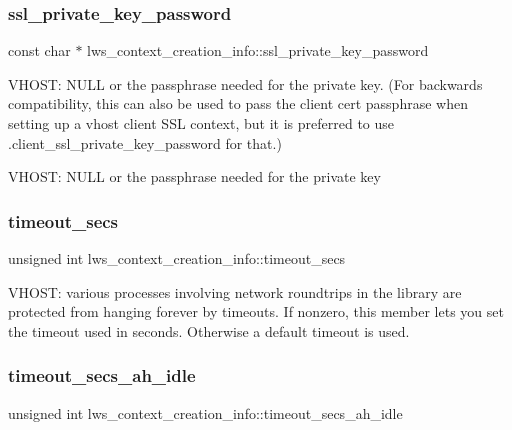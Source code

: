 \subsubsection{\texorpdfstring{ssl\+\_\+private\+\_\+key\+\_\+password}{ssl\_private\_key\_password}}
{\footnotesize\ttfamily const char $\ast$ lws\+\_\+context\+\_\+creation\+\_\+info\+::ssl\+\_\+private\+\_\+key\+\_\+password}

V\+H\+O\+ST\+: N\+U\+LL or the passphrase needed for the private key. (For backwards compatibility, this can also be used to pass the client cert passphrase when setting up a vhost client S\+SL context, but it is preferred to use .client\+\_\+ssl\+\_\+private\+\_\+key\+\_\+password for that.)

V\+H\+O\+ST\+: N\+U\+LL or the passphrase needed for the private key \mbox{\label{structlws__context__creation__info_a6cfa3d51df2def3349a5cbf0d712822d}} 
\subsubsection{\texorpdfstring{timeout\+\_\+secs}{timeout\_secs}}
{\footnotesize\ttfamily unsigned int lws\+\_\+context\+\_\+creation\+\_\+info\+::timeout\+\_\+secs}

V\+H\+O\+ST\+: various processes involving network roundtrips in the library are protected from hanging forever by timeouts. If nonzero, this member lets you set the timeout used in seconds. Otherwise a default timeout is used. \mbox{\label{structlws__context__creation__info_a5400952fc021de4d5c02a5193b1705f1}} 
\subsubsection{\texorpdfstring{timeout\+\_\+secs\+\_\+ah\+\_\+idle}{timeout\_secs\_ah\_idle}}
{\footnotesize\ttfamily unsigned int lws\+\_\+context\+\_\+creation\+\_\+info\+::timeout\+\_\+secs\+\_\+ah\+\_\+idle}

